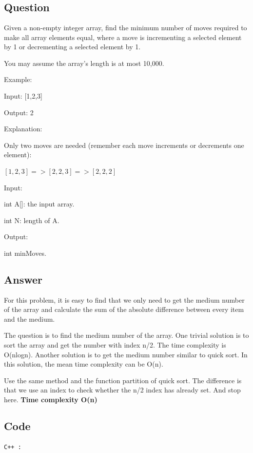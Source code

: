 \section{}
\subsection{Question}
Given a non-empty integer array, find the minimum number of moves required to make all array elements equal, where a move is incrementing a selected element by 1 or decrementing a selected element by 1.

You may assume the array's length is at most 10,000.

Example:

Input:
[1,2,3]

Output:
2

Explanation:

Only two moves are needed (remember each move increments or decrements one element):

$[1,2,3] => [2,2,3] => [2,2,2]$

Input:

int A[]: the input array.

int N: length of A.

Output:

int minMoves.


\subsection{Answer}
For this problem, it is easy to find that we only need to get the medium number of the array and calculate the sum of the absolute difference between every item and the medium.

The question is to find the medium number of the array. One trivial solution is to sort the array and get the number with index n/2. The time complexity is O(nlogn). Another solution is to get the medium number similar to quick sort. In this solution, the mean time complexity can be O(n).

Use the same method and the function partition of quick sort. The difference is that we use an index to check whether the n/2 index has already set. And stop here.
\textbf{\color{red}Time complexity O(n)}
\newpage
\subsection{Code}
\texttt{C++ :}


